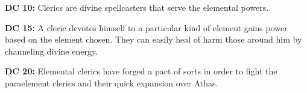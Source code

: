 \textbf{DC 10:} Clerics are divine spellcasters that serve the elemental powers.

\textbf{DC 15:} A cleric devotes himself to a particular kind of element gains power based on the element chosen. They can easily heal of harm those around him by channeling divine energy.

\textbf{DC 20:} Elemental clerics have forged a pact of sorts in order to fight the paraelement clerics and their quick expansion over Athas.
